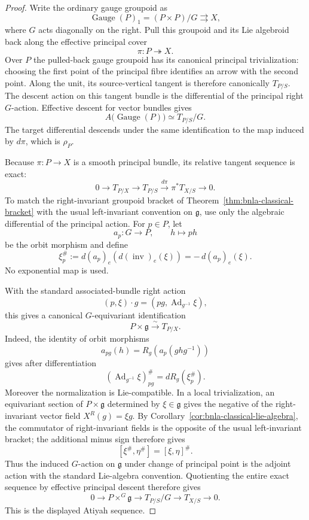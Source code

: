 \begin{proof}
Write the ordinary gauge groupoid as
\[
    \operatorname{Gauge}(P)_1
    =
    (P\times P)/G
    \rightrightarrows X,
\]
where $G$ acts diagonally on the right.  Pull this groupoid and its Lie
algebroid back along the effective principal cover
\[
    \pi:P\twoheadrightarrow X.
\]
Over $P$ the pulled-back gauge groupoid has its canonical principal
trivialization: choosing the first point of the principal fibre identifies an
arrow with the second point.  Along the unit, its source-vertical tangent is
therefore canonically $T_{P/S}$.  The descent action on this tangent bundle is
the differential of the principal right $G$-action.  Effective descent for
vector bundles gives
\[
    A\bigl(\operatorname{Gauge}(P)\bigr)
    \simeq
    T_{P/S}/G.
\]
The target differential descends under the same identification to the map
induced by $d\pi$, which is $\rho_P$.

Because $\pi:P\to X$ is a smooth principal bundle, its relative tangent
sequence is exact:
\[
    0
    \longrightarrow
    T_{P/X}
    \longrightarrow
    T_{P/S}
    \xrightarrow{d\pi}
    \pi^*T_{X/S}
    \longrightarrow
    0.
\]
To match the right-invariant groupoid bracket of
Theorem~\ref{thm:bnla-classical-bracket} with the usual left-invariant
convention on $\mathfrak g$, use only the algebraic differential of the
principal action.  For $p\in P$, let
\[
    a_p:G\longrightarrow P,
    \qquad
    h\longmapsto ph
\]
be the orbit morphism and define
\[
\boxed{
    \xi^\#_p
    :=
    d(a_p)_e\!\left(d(\operatorname{inv})_e(\xi)\right)
    =
    -\,d(a_p)_e(\xi).}
\]
No exponential map is used.

With the standard associated-bundle right action
\[
    (p,\xi)\cdot g
    =
    (pg,\operatorname{Ad}_{g^{-1}}\xi),
\]
this gives a canonical $G$-equivariant identification
\[
    P\times\mathfrak g
    \xrightarrow{\sim}
    T_{P/X}.
\]
Indeed, the identity of orbit morphisms
\[
    a_{pg}(h)
    =
    R_g\!\left(a_p(ghg^{-1})\right)
\]
gives after differentiation
\[
    \left(\operatorname{Ad}_{g^{-1}}\xi\right)^\#_{pg}
    =
    dR_g(\xi^\#_p).
\]
Moreover the normalization is Lie-compatible.  In a local trivialization, an
equivariant section of $P\times\mathfrak g$ determined by
$\xi\in\mathfrak g$ gives the negative of the right-invariant vector field
$X^R(g)=\xi g$.  By
Corollary~\ref{cor:bnla-classical-lie-algebra}, the commutator of
right-invariant fields is the opposite of the usual left-invariant bracket;
the additional minus sign therefore gives
\[
    [\xi^\#,\eta^\#]
    =
    [\xi,\eta]^\#.
\]
Thus the induced $G$-action on $\mathfrak g$ under change of principal point
is the adjoint action with the standard Lie-algebra convention.
Quotienting the entire exact sequence by effective principal descent therefore gives
\[
    0
    \longrightarrow
    P\times^G\mathfrak g
    \longrightarrow
    T_{P/S}/G
    \longrightarrow
    T_{X/S}
    \longrightarrow
    0.
\]
This is the displayed Atiyah sequence.


\end{proof}
